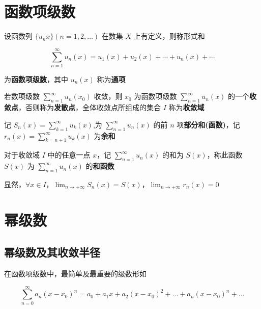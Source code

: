 \documentclass[lang = zh , final , oneside , openany , titlepage , zihao = -4 , linespread = 1.3 , baselineskip = false , cjk-font = windows , text-font = newtx , math-font = newtx , math-style = TeX]{sjtureport}
\begin{document}
\section{函数项级数}

\begin{definition}
    设函数列 \(\{u_n{x}\} (n=1,2,\ldots)\) 在数集 \(X\) 上有定义，则称形式和

\[\sum_{n=1}^\infty u_n(x)= u_1(x) + u_2(x) + \cdots + u_n(x) + \cdots\]

为\textbf{函数项级数}，其中 \(u_n(x)\) 称为\textbf{通项}
\end{definition}

\begin{definition}
    若数项级数 \(\displaystyle \sum_{n=1}^\infty u_n(x_0)\) 收敛，则 \(x_0\)
为函数项级数 \(\displaystyle \sum_{n=1}^\infty u_n(x)\)
的一个\textbf{收敛点}，否则称为\textbf{发散点}，全体收敛点所组成的集合
\(I\) 称为\textbf{收敛域}
\end{definition}

\begin{definition}
    记 \(\displaystyle S_n(x) =\sum_{k=1}^\infty u_k(x)\),为
\(\displaystyle \sum_{n=1}^\infty u_n(x)\) 的前 \(n\)
项\textbf{部分和(函数)}，记
\(\displaystyle r_n(x) = \sum_{k=n+1}^\infty u_k(x)\) 为\textbf{余和}
\end{definition}

\begin{definition}
    对于收敛域 \(I\) 中的任意一点 \(x\)，记
\(\displaystyle \sum_{n=1}^\infty u_n(x)\) 的和为 \(S(x)\)，称此函数
\(S(x)\) 为 \(\displaystyle \sum_{n=1}^\infty u_n(x)\) 的\textbf{和函数}

显然，\(\forall x\in I\)，\(\displaystyle \lim_{n\to +\infty}S_n(x) =S(x)\)，\(\displaystyle \lim_{n\to +\infty}r_n(x)=0\)
\end{definition}

\section{幂级数}

\subsection{幂级数及其收敛半径}

在函数项级数中，最简单及最重要的级数形如

\[\sum_{n=0}^\infty a_n(x-x_0)^n = a_0 +a_1x + a_2(x-x_0)^2 + \ldots + a_n(x-x_0)^n + \ldots\]
\end{document}
